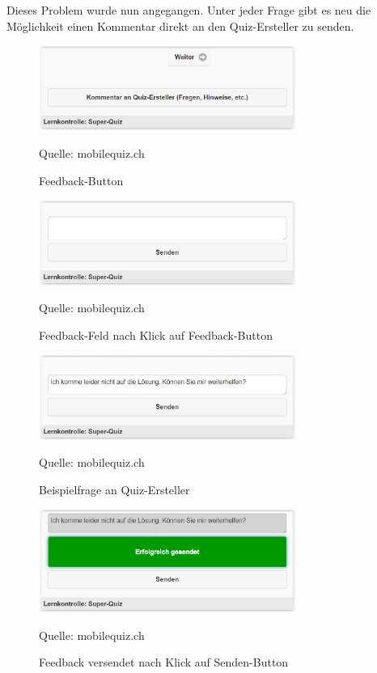 Dieses Problem wurde nun angegangen. Unter jeder Frage gibt es neu die Möglichkeit einen Kommentar direkt an den Quiz-Ersteller zu senden.

\begin{figure}[H]
	\centering
	\includegraphics[width=0.75\textwidth]{Images/Feedback-Button.PNG}
	\caption{Feedback-Button}
	Quelle: mobilequiz.ch
\end{figure}

\begin{figure}[H]
	\centering
	\includegraphics[width=0.75\textwidth]{Images/Feedback-Feld.PNG}
	\caption{Feedback-Feld nach Klick auf Feedback-Button}
	Quelle: mobilequiz.ch
\end{figure}

\begin{figure}[H]
	\centering
	\includegraphics[width=0.75\textwidth]{Images/Feedback-Frage.PNG}
	\caption{Beispielfrage an Quiz-Ersteller}
	Quelle: mobilequiz.ch
\end{figure}

\begin{figure}[H]
	\centering
	\includegraphics[width=0.75\textwidth]{Images/Feedback-Frage-gesendet.PNG}
	\caption{Feedback versendet nach Klick auf Senden-Button}
	Quelle: mobilequiz.ch
\end{figure}


